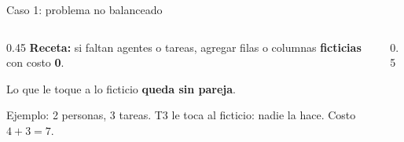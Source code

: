 \documentclass[aspectratio=169]{beamer}
\newcommand{\rejilla}[3]{%
  \foreach \i in {2,...,#2}{\foreach \j in {2,...,#3}{%
    \draw[gray!55, thin] (#1-\i-\j.north west) rectangle (#1-\i-\j.south east);}}%
  \draw[thick] (#1-2-2.north west) rectangle (#1-#2-#3.south east);}
\newcommand{\sfila}[3]{\begin{pgfonlayer}{background}\fill[gray!16] (#1-#2-2.north west) rectangle (#1-#2-#3.south east);\end{pgfonlayer}}
\newcommand{\cero}[2]{\node[asignado] at (#1-#2) {};}
\newcommand{\pie}[4]{\node[font=\scriptsize\itshape, below=1mm, align=center] at ($(#1-#2-2.south west)!0.5!(#1-#2-#3.south east)$) {#4};}
\begin{document}
\begin{frame}{Caso 1: problema no balanceado}
  \begin{columns}[c]
    \begin{column}{0.45\textwidth}
      \textbf{Receta:} si faltan agentes o tareas, agregar filas o columnas \textbf{ficticias} con costo \textbf{0}.

      \medskip
      Lo que le toque a lo ficticio \textbf{queda sin pareja}.

      \medskip
      {\small Ejemplo: 2 personas, 3 tareas. T3 le toca al ficticio: nadie la hace. Costo $4 + 3 = 7$.}
    \end{column}
    \begin{column}{0.5\textwidth}
      \centering
    \end{column}
  \end{columns}
\end{frame}
\end{document}
